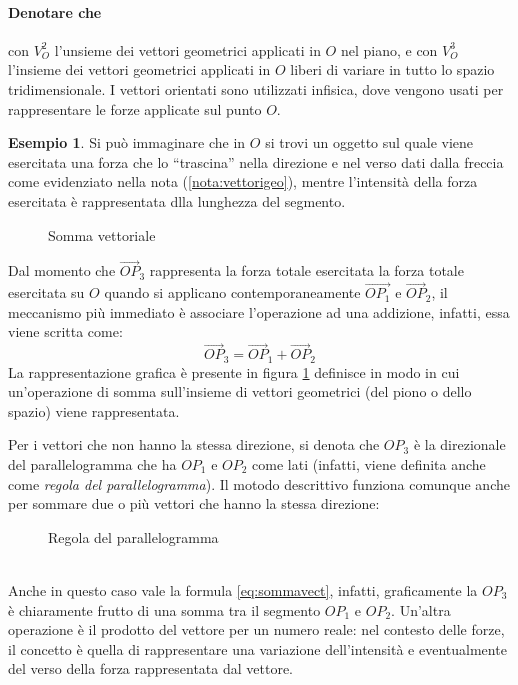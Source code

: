 \documentclass{book}
\theoremstyle{definition}
\newtheorem{es}{Esempio}[section]
\theoremstyle{plain}
\begin{document}
\paragraph{Denotare che}
con $V_O^2$ l'unsieme dei vettori geometrici applicati in $O$ nel piano, e con $V_O^3$ l'insieme dei vettori geometrici applicati in $O$ liberi di variare in tutto lo spazio tridimensionale. I vettori orientati sono utilizzati infisica, dove vengono usati per rappresentare le forze applicate sul punto $O$.
\begin{es}
  Si può immaginare che in $O$ si trovi un oggetto sul quale viene esercitata una forza che lo ``trascina'' nella direzione e nel verso dati dalla freccia come evidenziato nella nota (\ref{nota:vettorigeo}), mentre l'intensità della forza esercitata è rappresentata dlla lunghezza del segmento.
\begin{figure}[ht!]
  \centering
  \resizebox{7.5cm}{!}{
      
    }
  \caption{Somma vettoriale}
  \label{fig:sommavect}
\end{figure}
Dal momento che $\vec{OP}_3$ rappresenta la forza totale esercitata la forza totale esercitata su $O$ quando si applicano contemporaneamente $\vec{OP_1}$ e $\vec{OP}_2$, il meccanismo più immediato è associare l'operazione ad una addizione, infatti, essa viene scritta come:
\begin{equation}
  \label{eq:sommavect}
  \vec{OP}_3=\vec{OP}_1+\vec{OP}_2
\end{equation}
La rappresentazione grafica è presente in figura \ref{fig:sommavect} definisce in modo in cui un'operazione di somma sull'insieme di vettori geometrici (del piono o dello spazio) viene rappresentata.
\end{es}
Per i vettori che non hanno la stessa direzione, si denota che $OP_3$ è la direzionale del parallelogramma che ha $OP_1$ e $OP_2$ come lati (infatti, viene definita anche come \textit{regola del parallelogramma}). Il motodo descrittivo funziona comunque anche per sommare due o più vettori che hanno la stessa direzione:
\begin{figure}[ht!]
  \centering
  \resizebox{9cm}{!}{
      
    }
  \caption{Regola del parallelogramma}
  \label{fig:metparallelogramma}
\end{figure}\\
Anche in questo caso vale la formula \ref{eq:sommavect}, infatti, graficamente la $OP_3$ è chiaramente frutto di una somma tra il segmento $OP_1$ e $OP_2$. Un'altra operazione è il prodotto del vettore per un numero reale: nel contesto delle forze, il concetto è quella di rappresentare una variazione dell'intensità e eventualmente del verso della forza rappresentata dal vettore.\\
\end{document}
